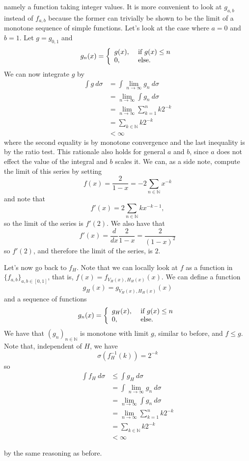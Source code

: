 \documentclass[a4paper,12pt,twoside,BCOR=10mm]{scrbook}
\theoremstyle{definition}
\theoremstyle{definition}
\theoremstyle{definition}
\begin{document}
namely a function taking integer values.
It is more convenient to look at $g_{a, b}$ instead of $f_{a, b}$ because the former can trivially be shown to be the limit of a monotone sequence of simple functions.
Let's look at the case where $a = 0$ and $b = 1$.
Let $g = g_{0, 1}$ and
\[
	g_n(x) = \left \{
	\begin{array}{l l}
	g(x), & \text{ if } g(x) \leq n \\
	0, & \text{ else}.
	\end{array}
	\right .
\]
We can now integrate $g$ by
\begin{align*}
	\int g\ d\sigma
	&= \int \lim_{n \rightarrow \infty} g_n\ d\sigma\\
	&= \lim_{n \rightarrow \infty} \int g_n\ d\sigma\\
	&= \lim_{n \rightarrow \infty} \sum_{k = 1}^n k2^{-k}\\
	&= \sum_{k \in \mathbb{N}} k2^{-k}\\
	&< \infty
\end{align*}
where the second equality is by monotone convergence and the last inequality is by the ratio test.
This rationale also holds for general $a$ and $b$, since $a$ does not effect the value of the integral and $b$ scales it.
We can, as a side note, compute the limit of this series by setting
\[
	f(x) = \frac{2}{1 - x} = -2\sum_{n \in \mathbb{N}} x^{-k}
\]
and note that
\[
	f'(x) = 2\sum_{n \in \mathbb{N}} kx^{-k - 1},
\]
so the limit of the series is $f'(2)$.
We also have that
\[
	f'(x) = \frac{d}{dx}\frac{2}{1 - x} = \frac{2}{(1 - x)^2}
\]
so $f'(2)$, and therefore the limit of the series, is $2$.

Let's now go back to $f_H$.
Note that we can locally look at $f$ as a function in $\{f_{a, b}\}_{a, b \in [0, 1]}$, that is, $f(x) = f_{V_H(x), H_H(x)}(x)$.
We can define a function
\[
	g_H(x) = g_{V_H(x), H_H(x)}(x)
\]
and a sequence of functions
\[
	g_n(x) = \left \{
	\begin{array}{l l}
	g_H(x), & \text{ if } g(x) \leq n \\
	0, & \text{ else}.
	\end{array}
	\right .
\]
We have that $(g_n)_{n \in \mathbb{N}}$ is monotone with limit $g$, similar to before, and $f \leq g$.
Note that, independent of $H$, we have
\[
	\sigma(f_H^{-1}(k)) = 2^{-k}
\]
so
\begin{align*}
\int f_H\ d\sigma
&\leq \int g_H\ d\sigma\\
&= \int \lim_{n \rightarrow \infty} g_n\ d\sigma\\
&= \lim_{n \rightarrow \infty} \int g_n\ d\sigma\\
&= \lim_{n \rightarrow \infty} \sum_{k = 1}^n k2^{-k}\\
&= \sum_{k \in \mathbb{N}} k2^{-k}\\
&< \infty
\end{align*}
\begin{center}
\end{center}
by the same reasoning as before.
\end{document}
